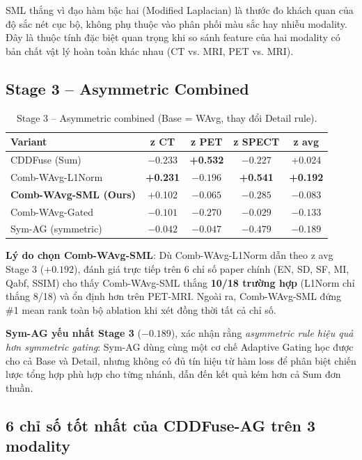 \documentclass[12pt,a4paper]{article}
\begin{document}
SML thắng vì đạo hàm bậc hai (Modified Laplacian) là thước đo khách quan của độ
sắc nét cục bộ, không phụ thuộc vào phân phối màu sắc hay nhiễu modality. Đây là
thuộc tính đặc biệt quan trọng khi so sánh feature của hai modality có bản chất
vật lý hoàn toàn khác nhau (CT vs. MRI, PET vs. MRI).

\subsection{Stage 3 -- Asymmetric Combined}

\begin{table}[h]
\centering
\caption{Stage 3 -- Asymmetric combined (Base = WAvg, thay đổi Detail rule).}
\label{tab:stage3}
\small
\setlength{\tabcolsep}{4pt}
\begin{tabular}{lcccc}
\toprule
\textbf{Variant} & \textbf{z CT} & \textbf{z PET} & \textbf{z SPECT} & \textbf{z avg} \\
\midrule
CDDFuse (Sum)                  & $-0.233$ & \textbf{+0.532} & $-0.227$ & +0.024 \\
Comb-WAvg-L1Norm               & \textbf{+0.231} & $-0.196$ & \textbf{+0.541} & \textbf{+0.192} \\
\textbf{Comb-WAvg-SML (Ours)}  & +0.102 & $-0.065$ & $-0.285$ & $-0.083$ \\
Comb-WAvg-Gated                & $-0.101$ & $-0.270$ & $-0.029$ & $-0.133$ \\
Sym-AG (symmetric)             & $-0.042$ & $-0.047$ & $-0.479$ & $-0.189$ \\
\bottomrule
\end{tabular}
\end{table}

\textbf{Lý do chọn Comb-WAvg-SML}: Dù Comb-WAvg-L1Norm dẫn theo z avg Stage 3
($+0.192$), đánh giá trực tiếp trên 6 chỉ số paper chính (EN, SD, SF, MI, Qabf,
SSIM) cho thấy Comb-WAvg-SML thắng \textbf{10/18 trường hợp} (L1Norm chỉ thắng
8/18) và ổn định hơn trên PET-MRI. Ngoài ra, Comb-WAvg-SML đứng \#1 mean rank
toàn bộ ablation khi xét đồng thời tất cả chỉ số.

\textbf{Sym-AG yếu nhất Stage 3} ($-0.189$), xác nhận rằng \emph{asymmetric
rule hiệu quả hơn symmetric gating}: Sym-AG dùng cùng một cơ chế Adaptive Gating
học được cho cả Base và Detail, nhưng không có đủ tín hiệu từ hàm loss để phân
biệt chiến lược tổng hợp phù hợp cho từng nhánh, dẫn đến kết quả kém hơn cả Sum
đơn thuần.

\subsection{6 chỉ số tốt nhất của CDDFuse-AG trên 3 modality}
\label{ssec:best6}
\end{document}
